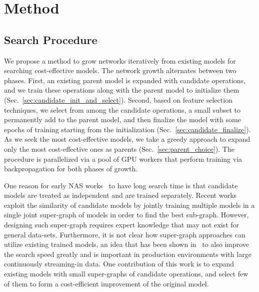 \section{Method}

\subsection{Search Procedure}
\label{sec:search_procedure}



We propose a method to grow networks iteratively from existing models for searching cost-effective models. 
The network growth alternates between two phases. First, an existing parent model is expanded with candidate operations, and we train these operations along with the parent model to initialize them (Sec.~\ref{sec:candidate_init_and_select}). Second, based on feature selection techniques, we select from among the candidate operations, a small subset to permanently add to the parent model, and then finalize the model with some epochs of training starting from the initialization (Sec.~\ref{sec:candidate_finalize}). As we seek the most cost-effective models, we take a greedy approach to expand only the most cost-effective ones as parents (Sec.~\ref{sec:parent_choice}). 
The procedure is parallelized via a pool of GPU workers that perform training via backpropagation for both phases of growth. 

One reason for early NAS works~\citep{nas,NASCell,Real2018RegularizedEF} to have long search time is that candidate models are treated as independent and are trained separately. Recent works~\citep{Pham2018EfficientNA, Liu2018DARTSDA} exploit the similarity of candidate models by jointly training multiple models in a single joint super-graph of models in order to find the best sub-graph. However, designing such super-graph requires expert knowledge that may not exist for general data-sets. Furthermore, it is not clear how super-graph approaches can utilize existing trained models, an idea that has been shown in~\citep{Elsken2018EfficientMN} to also improve the search speed greatly and is important in production environments with large continuously streaming-in data. One contribution of this work is to expand existing models with small super-graphs of candidate operations, and select few of them to form a cost-efficient improvement of the original model. 

